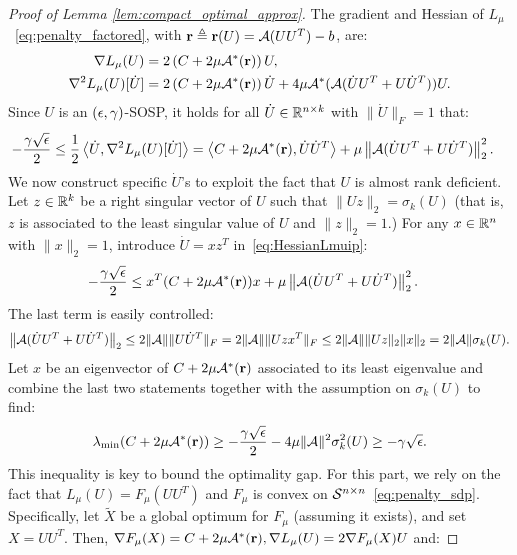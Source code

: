\begin{proof}[Proof of Lemma \ref{lem:compact_optimal_approx}]
	The gradient and Hessian of $L_\mu$~\eqref{eq:penalty_factored}, with $\mathbf{r} \triangleq \mathbf{r}(U) = \mathcal{A}(UU^T)-b$, are:
	\begin{align}
		\nabla L_\mu(U) & = 2\left( C + 2\mu\mathcal{A}^*(\mathbf{r}) \right)U,\label{eq:gradLmu}\\
		\nabla^2 L_\mu(U)[\dot U] & = 2\left( C + 2\mu\mathcal{A}^*(\mathbf{r}) \right)\dot U + 4\mu\mathcal{A}^*(\mathcal{A}(\dot U U^T + U\dot U^T))U. \label{eq:HessianLmu}
	\end{align}
	Since $U$ is an $(\epsilon, \gamma)$-SOSP, it holds for all $\dot U \in \mathbb{R}^{n\times k}$ with $\|\dot U\|_F = 1$ that:
	\begin{align}
		-\frac{\gamma\sqrt{\epsilon}}{2} & \leq \frac{1}{2} \left\langle \dot U, \nabla^2 L_\mu(U)[\dot U] \right\rangle = \left\langle C + 2\mu\mathcal{A}^*(\mathbf{r}), \dot U \dot U^T \right\rangle + \mu \left\|\mathcal{A}(\dot U U^T + U \dot U^T)\right\|_2^2.
		 \label{eq:HessianLmuip}
	\end{align}
	We now construct specific $\dot U$'s to exploit the fact that $U$ is almost rank deficient. Let $z \in \mathbb{R}^k$ be a right singular vector of $U$ such that $\|Uz\|_2 =\sigma_k(U)$ (that is, $z$ is associated to the least singular value of $U$ and $\|z\|_2 = 1$.) For any $x \in \mathbb{R}^{n}$ with $\|x\|_2 = 1$, introduce $\dot U = xz^T$ in~\eqref{eq:HessianLmuip}:
	\begin{align*}
	 	-\frac{\gamma\sqrt{\epsilon}}{2} & \leq x^T(C + 2\mu\mathcal{A}^*(\mathbf{r}))x + \mu \left\|\mathcal{A}(\dot U U^T + U \dot U^T)\right\|_2^2.
	\end{align*}
	The last term is easily controlled:
	\begin{align*}
		\left\|\mathcal{A}(\dot U U^T + U \dot U^T)\right\|_2 \leq 2 \|\mathcal{A}\| \|U\dot U^T\|_F = 2 \|\mathcal{A}\| \|Uzx^T\|_F \leq 2 \|\mathcal{A}\|\|Uz\|_2 \|x\|_2 = 2 \|\mathcal{A}\|\sigma_k(U).
	\end{align*}
	Let $x$ be an eigenvector of $C + 2\mu\mathcal{A}^*(\mathbf{r})$ associated to its least eigenvalue and combine the last two statements together with the assumption on $\sigma_k(U)$ to find:
	\begin{align}
		\lambda_{\min}(C + 2\mu\mathcal{A}^*(\mathbf{r})) \geq -\frac{\gamma\sqrt{\epsilon}}{2} - 4\mu\|\mathcal{A}\|^2\sigma_k^2(U) \geq -\gamma\sqrt{\epsilon}.
		\label{eq:lambdaminC2mu}
	\end{align}
	This inequality is key to bound the optimality gap. For this part, we rely on the fact that $L_\mu(U) = F_\mu(UU^T)$ and $F_\mu$ is convex on $\mathcal{S}^{n\times n}$~\eqref{eq:penalty_sdp}. Specifically, let $\tilde X$ be a global optimum for $F_\mu$ (assuming it exists), and set $X = UU^T$. Then, $\nabla F_\mu(X) = C + 2\mu\mathcal{A}^*(\mathbf{r}), \nabla L_\mu(U) = 2\nabla F_\mu(X)U$ and:

\end{proof}
